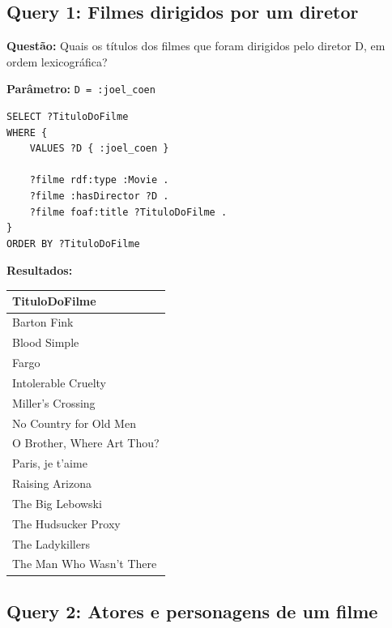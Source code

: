 \documentclass[12pt,a4paper]{article}
\begin{document}
\subsection{Query 1: Filmes dirigidos por um diretor}

\textbf{Questão:} Quais os títulos dos filmes que foram dirigidos pelo diretor D, em ordem lexicográfica?

\textbf{Parâmetro:} \texttt{D = :joel\_coen}

\begin{lstlisting}
SELECT ?TituloDoFilme
WHERE {
    VALUES ?D { :joel_coen }
    
    ?filme rdf:type :Movie .
    ?filme :hasDirector ?D .
    ?filme foaf:title ?TituloDoFilme .
}
ORDER BY ?TituloDoFilme
\end{lstlisting}

\textbf{Resultados:}

\begin{table}[H]
\centering
\begin{tabular}{|l|}
\hline
\textbf{TituloDoFilme} \\
\hline
Barton Fink \\
\hline
Blood Simple \\
\hline
Fargo \\
\hline
Intolerable Cruelty \\
\hline
Miller's Crossing \\
\hline
No Country for Old Men \\
\hline
O Brother, Where Art Thou? \\
\hline
Paris, je t'aime \\
\hline
Raising Arizona \\
\hline
The Big Lebowski \\
\hline
The Hudsucker Proxy \\
\hline
The Ladykillers \\
\hline
The Man Who Wasn't There \\
\hline
\end{tabular}
\end{table}

\newpage
\subsection{Query 2: Atores e personagens de um filme}
\end{document}
